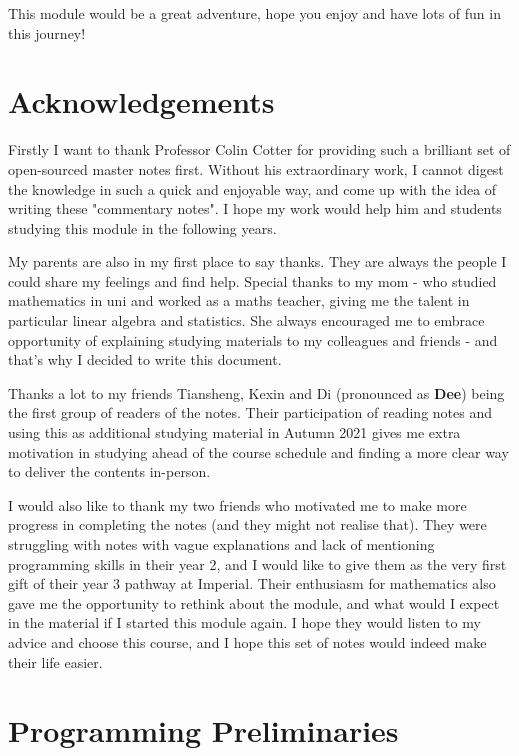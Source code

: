 \documentclass[a4paper,11pt,twoside]{report}
\begin{document}
This module would be a great adventure, hope you enjoy and have lots of fun in this journey!

\chapter*{Acknowledgements}
Firstly I want to thank Professor Colin Cotter for providing such a brilliant set of open-sourced master notes first.
Without his extraordinary work, I cannot digest the knowledge in such a quick and enjoyable way, and come up with the idea of writing these "commentary notes". 
I hope my work would help him and students studying this module in the following years.\smallskip

My parents are also in my first place to say thanks. They are always the people I could share my feelings and find help. Special thanks to my mom - who studied mathematics in uni and worked as a maths teacher, giving me the talent in particular linear algebra and statistics. She always encouraged me to embrace opportunity of explaining studying materials to my colleagues and friends - and that's why I decided to write this document.\smallskip

Thanks a lot to my friends Tiansheng, Kexin and Di (pronounced as \textbf{Dee}) being the first group of readers of the notes. Their participation of reading notes and using this as additional studying material in Autumn 2021 gives me extra motivation in studying ahead of the course schedule and finding a more clear way to deliver the contents in-person.\smallskip

I would also like to thank my two friends who motivated me to make more progress in completing the notes (and they might not realise that). They were struggling with notes with vague explanations and lack of mentioning programming skills in their year 2, and I would like to give them as the very first gift of their year 3 pathway at Imperial. Their enthusiasm for mathematics also gave me the opportunity to rethink about the module, and what would I expect in the material if I started this module again. I hope they would listen to my advice and choose this course, and I hope this set of notes would indeed make their life easier.
\tableofcontents

\chapter{Programming Preliminaries}
\end{document}
